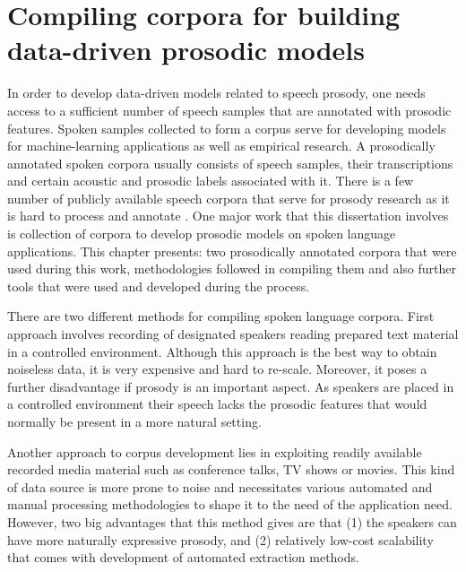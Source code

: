 \chapter{Compiling corpora for building data-driven prosodic models}
\label{chapter:corpusWorks}

In order to develop data-driven models related to speech prosody, one needs access to a sufficient number of speech samples that are annotated with prosodic features. Spoken samples collected to form a corpus serve for developing models for machine-learning applications as well as empirical research. A prosodically annotated spoken corpora usually consists of speech samples, their transcriptions and certain acoustic and prosodic labels associated with it. There is a few number of publicly available speech corpora that serve for prosody research as it is hard to process and annotate \citep{rosenberg}. One major work that this dissertation involves is collection of corpora to develop prosodic models on spoken language applications. This chapter presents: two prosodically annotated corpora that were used during this work, methodologies followed in compiling them and also further tools that were used and developed during the process.

There are two different methods for compiling spoken language corpora. First approach involves recording of designated speakers reading prepared text material in a controlled environment. Although this approach is the best way to obtain noiseless data, it is very expensive and hard to re-scale. Moreover, it poses a further disadvantage if prosody is an important aspect. As speakers are placed in a controlled environment their speech lacks the prosodic features that would normally be present in a more natural setting. 

Another approach to corpus development lies in exploiting readily available recorded media material such as conference talks, TV shows or movies. This kind of data source is more prone to noise and necessitates various automated and manual processing methodologies to shape it to the need of the application need. However, two big advantages that this method gives are that (1) the speakers can have more naturally expressive prosody, and (2) relatively low-cost scalability that comes with development of automated extraction methods. 

